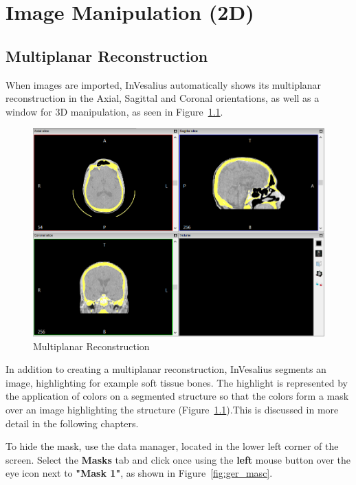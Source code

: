 \chapter{Image Manipulation (2D)}

\section{Multiplanar Reconstruction}

When images are imported, InVesalius automatically shows its multiplanar reconstruction in the Axial, Sagittal and Coronal orientations, as well as a window for 3D manipulation, as seen in Figure~\ref{fig:mpr}.

\begin{figure}[!htb]
\centering
\includegraphics[scale=0.40]{../user_guide_figures/invesalius_screen/multiplanar_mask_window_en.png}
\caption{Multiplanar Reconstruction}
\label{fig:mpr}
\end{figure}

\newpage

In addition to creating a multiplanar reconstruction, InVesalius segments an image, highlighting for example soft tissue bones. The highlight is represented by the application of colors on a segmented structure so that the colors form a mask over an image highlighting the structure (Figure~\ref{fig:mpr}).This is discussed in more detail in the following chapters.

To hide the mask, use the data manager, located in the lower left corner of the screen. Select the \textbf{Masks} tab and click once using the \textbf{left} mouse button over the eye icon next to \textbf{"Mask 1"}, as shown in Figure~\ref{fig:ger_masc}.

